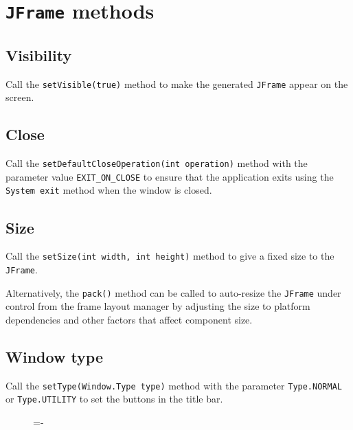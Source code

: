 \documentclass[a4paper]{systems-software}
\begin{document}
\section*{\texttt{JFrame} methods}

\subsection*{Visibility}

Call the \texttt{setVisible(true)} method to make the generated \texttt{JFrame} appear on the screen.


\subsection*{Close}

Call the \texttt{setDefaultCloseOperation(int operation)} method with the parameter value \texttt{EXIT\_ON\_CLOSE} to ensure that the application exits using the \texttt{System exit} method when the window is closed.


\subsection*{Size}

Call the \texttt{setSize(int width, int height)} method to give a fixed size to the \texttt{JFrame}.

Alternatively, the \texttt{pack()} method can be called to auto-resize the \texttt{JFrame} under control from the frame layout manager by adjusting the size to platform dependencies and other factors that affect component size.


\subsection*{Window type}

Call the \texttt{setType(Window.Type type)} method with the parameter \texttt{Type.NORMAL} or \texttt{Type.UTILITY} to set the buttons in the title bar.

\begin{figure}[H]
	\lineskip=-\fboxrule
\end{figure}
\end{document}
